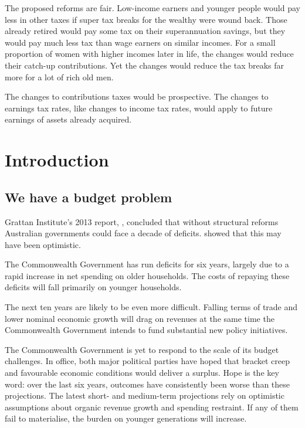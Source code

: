 \begin{overview}[-25pt]
The proposed reforms are fair. Low-income earners and younger people would pay less in other taxes if super tax breaks for the wealthy were wound back. Those already retired would pay some tax on their superannuation savings, but they would pay much less tax than wage earners on similar incomes. For a small proportion of women with higher incomes later in life, the changes would reduce their catch-up contributions. Yet the changes would reduce the tax breaks far more for a lot of rich old men. 

The changes to contributions taxes would be prospective. The changes to earnings tax rates, like changes to income tax rates, would apply to future earnings of assets already acquired.

\end{overview}
\addtolength{\columnsep}{-\overviewextra}

\chapter{Introduction}
\section{We have a budget problem}
Grattan Institute’s 2013 report, , concluded that without structural reforms Australian governments could face a decade of deficits.   showed that this may have been optimistic. 

The Commonwealth Government has run deficits for six years, largely due to a rapid increase in net spending on older households. The costs of repaying these deficits will fall primarily on younger households.\oneraggedpage

The next ten years are likely to be even more difficult. Falling terms of trade and lower nominal economic growth will drag on revenues at the same time the Commonwealth Government intends to fund substantial new policy initiatives.

The Commonwealth Government is yet to respond to the scale of its budget challenges. In office, both major political parties have hoped that bracket creep and favourable economic conditions would deliver a surplus. Hope is the key word: over the last six years, outcomes have consistently been worse than these projections. The latest short- and medium-term projections rely on optimistic assumptions about organic revenue growth and spending restraint. If any of them fail to materialise, the burden on younger generations will increase.

